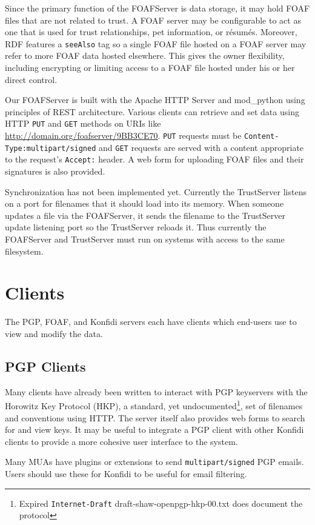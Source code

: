 \documentclass[letterpaper]{www2006-submission}
\begin{document}
Since the primary function of the FOAFServer is data storage, it may hold FOAF files that are not related to trust.  A FOAF server may be configurable to act as one that is used for trust relationships, pet information, or r\'{e}sum\'{e}s.  Moreover, RDF features a \texttt{seeAlso} tag so a single FOAF file hosted on a FOAF server may refer to more FOAF data hosted elsewhere.  This gives the owner flexibility, including encrypting or limiting access to a FOAF file hosted under his or her direct control.

Our FOAFServer is built with the Apache HTTP Server and mod\_\-py\-thon using principles of REST architecture.  Various clients can retrieve and set data using HTTP \texttt{PUT} and \texttt{GET} methods on URIs like \url{http://domain.org/foafserver/9BB3CE70}.  \texttt{PUT} requests must be \texttt{Content-Type:multipart/signed} and \texttt{GET} requests are served with a content appropriate to the request's \texttt{Accept:} header.  A web form for uploading FOAF files and their signatures is also provided.

Synchronization has not been implemented yet.  Currently the TrustServer listens on a port for filenames that it should load into its memory.  When someone updates a file via the FOAFServer, it sends the filename to the TrustServer update listening port so the TrustServer reloads it.  Thus currently the FOAFServer and TrustServer must run on systems with access to the same filesystem.

\section{Clients}
The PGP, FOAF, and Konfidi servers each have clients which end-users use to view and modify the data.

\subsection{PGP Clients}
Many clients have already been written to interact with PGP keyservers with the Horowitz Key Protocol (HKP), a standard, yet undocumented\footnote{Expired \texttt{Internet-Draft} draft-shaw-openpgp-hkp-00.txt does document the protocol}, set of filenames and conventions using HTTP.  The server itself also provides web forms to search for and view keys.  It may be useful to integrate a PGP client with other Konfidi clients to provide a more cohesive user interface to the system.

Many MUAs have plugins or extensions to send \texttt{mul\-ti\-part/\-signed} PGP emails.  Users should use these for Konfidi to be useful for email filtering.
\end{document}
